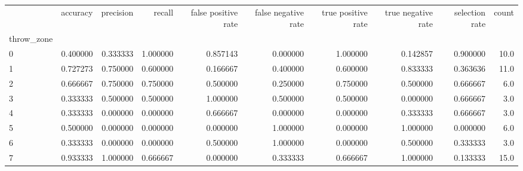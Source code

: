 \begin{tabular}{lrrrrrrrrr}
\toprule
{} &  accuracy &  precision &    recall &  false positive rate &  false negative rate &  true positive rate &  true negative rate &  selection rate &  count \\
throw\_zone &           &            &           &                      &                      &                     &                     &                 &        \\
\midrule
0          &  0.400000 &   0.333333 &  1.000000 &             0.857143 &             0.000000 &            1.000000 &            0.142857 &        0.900000 &   10.0 \\
1          &  0.727273 &   0.750000 &  0.600000 &             0.166667 &             0.400000 &            0.600000 &            0.833333 &        0.363636 &   11.0 \\
2          &  0.666667 &   0.750000 &  0.750000 &             0.500000 &             0.250000 &            0.750000 &            0.500000 &        0.666667 &    6.0 \\
3          &  0.333333 &   0.500000 &  0.500000 &             1.000000 &             0.500000 &            0.500000 &            0.000000 &        0.666667 &    3.0 \\
4          &  0.333333 &   0.000000 &  0.000000 &             0.666667 &             0.000000 &            0.000000 &            0.333333 &        0.666667 &    3.0 \\
5          &  0.500000 &   0.000000 &  0.000000 &             0.000000 &             1.000000 &            0.000000 &            1.000000 &        0.000000 &    6.0 \\
6          &  0.333333 &   0.000000 &  0.000000 &             0.500000 &             1.000000 &            0.000000 &            0.500000 &        0.333333 &    3.0 \\
7          &  0.933333 &   1.000000 &  0.666667 &             0.000000 &             0.333333 &            0.666667 &            1.000000 &        0.133333 &   15.0 \\
\bottomrule
\end{tabular}
